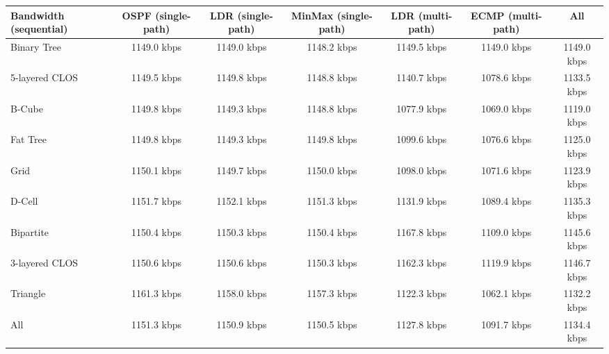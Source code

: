 \begin{tabular}{l|cccccc}
Bandwidth (sequential) & OSPF (single-path) & LDR (single-path) & MinMax (single-path) & LDR (multi-path) & ECMP (multi-path) & All         \\
\hline
Binary Tree            & 1149.0 kbps        & 1149.0 kbps       & 1148.2 kbps          & 1149.5 kbps      & 1149.0 kbps       & 1149.0 kbps \\
5-layered CLOS         & 1149.5 kbps        & 1149.8 kbps       & 1148.8 kbps          & 1140.7 kbps      & 1078.6 kbps       & 1133.5 kbps \\
B-Cube                 & 1149.8 kbps        & 1149.3 kbps       & 1148.8 kbps          & 1077.9 kbps      & 1069.0 kbps       & 1119.0 kbps \\
Fat Tree               & 1149.8 kbps        & 1149.3 kbps       & 1149.8 kbps          & 1099.6 kbps      & 1076.6 kbps       & 1125.0 kbps \\
Grid                   & 1150.1 kbps        & 1149.7 kbps       & 1150.0 kbps          & 1098.0 kbps      & 1071.6 kbps       & 1123.9 kbps \\
D-Cell                 & 1151.7 kbps        & 1152.1 kbps       & 1151.3 kbps          & 1131.9 kbps      & 1089.4 kbps       & 1135.3 kbps \\
Bipartite              & 1150.4 kbps        & 1150.3 kbps       & 1150.4 kbps          & 1167.8 kbps      & 1109.0 kbps       & 1145.6 kbps \\
3-layered CLOS         & 1150.6 kbps        & 1150.6 kbps       & 1150.3 kbps          & 1162.3 kbps      & 1119.9 kbps       & 1146.7 kbps \\
Triangle               & 1161.3 kbps        & 1158.0 kbps       & 1157.3 kbps          & 1122.3 kbps      & 1062.1 kbps       & 1132.2 kbps \\
All                    & 1151.3 kbps        & 1150.9 kbps       & 1150.5 kbps          & 1127.8 kbps      & 1091.7 kbps       & 1134.4 kbps \\
\end{tabular}